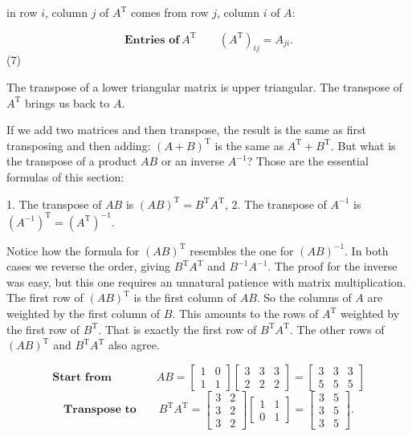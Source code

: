 in row \(i\), column \(j\) of \(A^{\mathrm{T}}\) comes from row \(j\), column \(i\) of \(A\):

\[\textbf{Entries of}\ A^{\mathrm{T}}\qquad(A^{\mathrm{T}})_{ij}=A_{ji}.\] (7)

The transpose of a lower triangular matrix is upper triangular. The transpose of \(A^{\mathrm{T}}\) brings us back to \(A\).

If we add two matrices and then transpose, the result is the same as first transposing and then adding: \((A+B)^{\mathrm{T}}\) is the same as \(A^{\mathrm{T}}+B^{\mathrm{T}}\). But what is the transpose of a product \(AB\) or an inverse \(A^{-1}\)? Those are the essential formulas of this section:

1. The transpose of \(AB\) is \((AB)^{\mathrm{T}}=B^{\mathrm{T}}A^{\mathrm{T}}\),
2. The transpose of \(A^{-1}\) is \((A^{-1})^{\mathrm{T}}=(A^{\mathrm{T}})^{-1}\).

Notice how the formula for \((AB)^{\mathrm{T}}\) resembles the one for \((AB)^{-1}\). In both cases we reverse the order, giving \(B^{\mathrm{T}}A^{\mathrm{T}}\) and \(B^{-1}A^{-1}\). The proof for the inverse was easy, but this one requires an unnatural patience with matrix multiplication. The first row of \((AB)^{\mathrm{T}}\) is the first column of \(AB\). So the columns of \(A\) are weighted by the first column of \(B\). This amounts to the rows of \(A^{\mathrm{T}}\) weighted by the first row of \(B^{\mathrm{T}}\). That is exactly the first row of \(B^{\mathrm{T}}A^{\mathrm{T}}\). The other rows of \((AB)^{\mathrm{T}}\) and \(B^{\mathrm{T}}A^{\mathrm{T}}\) also agree.

\[\textbf{Start from}\qquad\qquad AB =\begin{bmatrix}1&0\\ 1&1\end{bmatrix}\begin{bmatrix}3&3&3\\ 2&2&2\end{bmatrix}=\begin{bmatrix}3&3&3\\ 5&5&5\end{bmatrix}\] \[\textbf{Transpose to}\qquad B^{\mathrm{T}}A^{\mathrm{T}} =\begin{bmatrix}3&2\\ 3&2\\ 3&2\end{bmatrix}\begin{bmatrix}1&1\\ 0&1\end{bmatrix}=\begin{bmatrix}3&5\\ 3&5\\ 3&5\end{bmatrix}.\]

